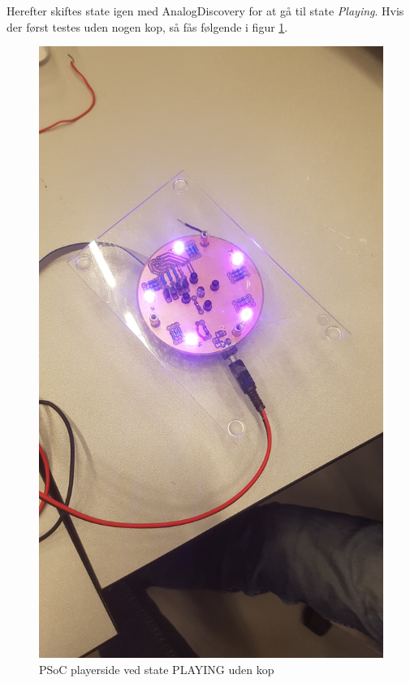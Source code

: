 \documentclass[Integrationstest/Integrationstest_main.tex]{subfiles}
\begin{document}
Herefter skiftes state igen med AnalogDiscovery for at gå til state \textit{Playing}. Hvis der først testes uden nogen kop, så fås følgende i figur \ref{fig:int_playerside_playing_opp}.
\begin{figure}[H]
    \centering
    \includegraphics[width=\textwidth]{Integrationstest/Integrationstest_PlayerSide/graphics/CupSensorInt/PLAYING_opp_col.jpg}
    \caption{PSoC playerside ved state PLAYING uden kop}
    \label{fig:int_playerside_playing_opp}
\end{figure}
\end{document}
